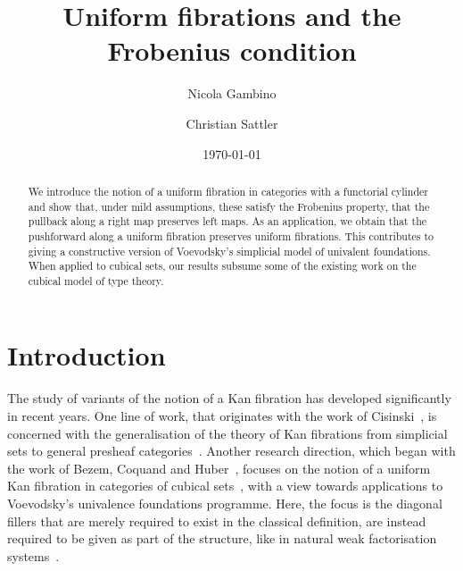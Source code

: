 \documentclass[reqno,10pt,a4paper,oneside,draft]{amsart}
\title{Uniform fibrations and the Frobenius condition}
\begin{document}
\begin{abstract} 
We introduce the notion of a uniform fibration in categories with a functorial cylinder and show that, under mild assumptions, these satisfy the Frobenius property, \ie that the pullback along a right map preserves left maps.
As an application, we obtain that the pushforward along a uniform  fibration preserves uniform fibrations.
This contributes to giving a constructive version of Voevodsky's simplicial model of univalent foundations.
When applied to cubical sets, our results  subsume some of the existing work on the cubical model of type theory.
\end{abstract}

\author{Nicola Gambino}
\address{School of Mathematics, University of Leeds, Leeds LS2 9JT, UK}

\author{Christian Sattler}
\address{School of Mathematics, University of Leeds, Leeds LS2 9JT, UK}

\date{\today}

\maketitle

\tableofcontents


\section*{Introduction}


The study of variants of the notion of a Kan fibration has developed significantly in recent years. One line of work, that originates with the work of Cisinski~\cite{cisinski-asterisque}, is concerned with the generalisation of the theory of Kan fibrations from simplicial sets to general presheaf categories~\cite{cisinski-univalence,moerdijk-minimal}. Another research direction, which began with the work of Bezem, Coquand and Huber~\cite{coquand-cubical-sets}, focuses on the notion of a uniform Kan fibration in categories of cubical sets~\cite{awodey-cubical,coquand-cubical-sets,coquand-variation,huber-thesis,pitts-cubical-nominal,swan-awfs}, with a view towards applications to Voevodsky's univalence foundations programme. Here, the focus is  the diagonal fillers that are merely required to exist in the classical definition, are instead required to be given as part of the structure, like in natural weak factorisation systems~\cite{grandis-tholen-nwfs}.
\end{document}
